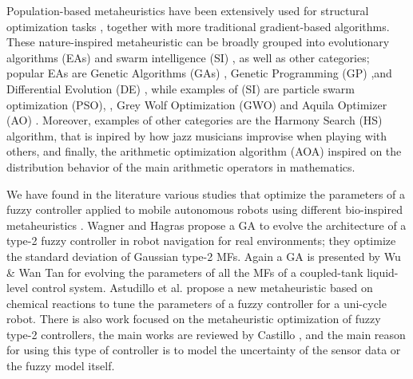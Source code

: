 \documentclass[symmetry,article,submit,moreauthors,pdftex]{Definitions/mdpi}
\begin{document}
Population-based metaheuristics have been extensively used for structural
optimization tasks \cite{perez2007particle,durgun2012structural,yildiz2012new,geem2005harmony}, 
together with more traditional gradient-based algorithms. These nature-inspired  
metaheuristic can be broadly grouped into evolutionary
algorithms (EAs) \cite{back1996evolutionary} and swarm intelligence (SI)
\cite{kennedy2006swarm}, as well as other categories; popular EAs are Genetic
Algorithms (GAs) \cite{holland1992adaptation,eiben2003genetic}, Genetic
Programming (GP) \cite{back1996evolutionary},and Differential Evolution (DE)
\cite{karabouga2004simple}, while examples of (SI) \cite{kennedy2006swarm} are
particle swarm optimization (PSO), \cite{clerc2010particle}, Grey Wolf
Optimization (GWO) \cite{mirjalili2014grey} and Aquila Optimizer (AO)
\cite{abualigah2021aquila}. Moreover, examples of other categories are the
Harmony Search (HS) \cite{geem2001new} algorithm, that is inpired by how jazz
musicians improvise when playing with others, and finally, the arithmetic
optimization algorithm (AOA) \cite{abualigah2021arithmetic} inspired on the
distribution behavior of the main arithmetic operators in mathematics.


We have found in the literature various studies that optimize the parameters of
a fuzzy controller applied to mobile autonomous robots using different
bio-inspired metaheuristics
\cite{hernandez_optimization_2019,lagunes_methodology_2017}.  Wagner and Hagras
\cite{wagner2007genetic} propose a GA to evolve the architecture of a type-2
fuzzy controller in robot navigation for real environments; they optimize the
standard deviation of Gaussian type-2 MFs.  Again a GA is presented by Wu \&
Wan Tan \cite{wu2006genetic} for evolving the parameters of all the MFs of a
coupled-tank liquid-level control system.  Astudillo et al.
\cite{astudillo2013optimization} propose a new metaheuristic based on chemical
reactions to tune the parameters of a fuzzy controller for a uni-cycle robot.
There is also work focused on the metaheuristic optimization of fuzzy type-2
controllers, the main works are reviewed by Castillo
\cite{castillo_review_2012}, and the main reason for using this type of
controller is to model the uncertainty of the sensor data or the fuzzy model
itself.
\end{document}
